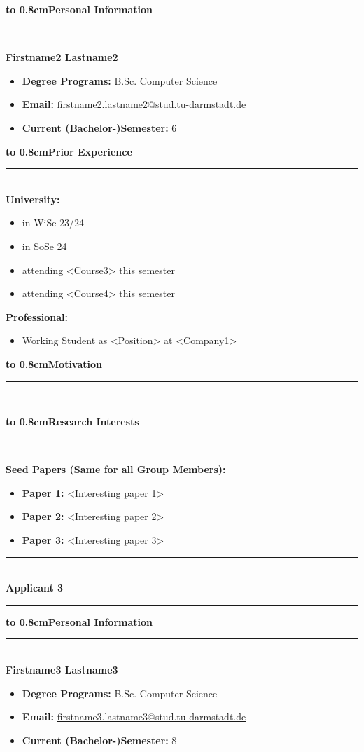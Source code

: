 \documentclass[
    USenglish,
    accentcolor=3b,
]{tudaexercise}
\newcommand{\fat}[1]{{\Large\textbf{\textcolor{accentcolor}{\textsf{#1}}}}}
\newcommand{\iconpsection}[2]{%
    \mbox{}\fat{\hbox to 0.8cm{#1}#2}%
    \vspace{-1.2em}\par\noindent\rule{\textwidth}{0.4pt}\\[1em]
}
\newcommand{\applicant}[1]{%
\rule{\textwidth}{0.4pt}\\[.4ex]%
{\LARGE\bfseries Applicant #1}\\[-1.2ex]%
\rule{\textwidth}{0.4pt}%
}
\newcommand{\seedpapers}{
    \begin{defBox}
        \begin{itemize}
            \item \textbf{Paper 1:} <Interesting paper 1>
            \item \textbf{Paper 2:} <Interesting paper 2>
            \item \textbf{Paper 3:} <Interesting paper 3>
        \end{itemize}
    \end{defBox}
}
\begin{document}
    \iconpsection{\faUser}{Personal Information}
    \textbf{\large Firstname2 Lastname2}
    \begin{itemize}
        \item \textbf{Degree Programs:} B.Sc. Computer Science
        \item \textbf{Email:} \href{mailto:firstname2.lastname2@stud.tu-darmstadt.de}{firstname2.lastname2@stud.tu-darmstadt.de}
        \item \textbf{Current (Bachelor-)Semester:} 6
    \end{itemize}

    \iconpsection{\faGraduationCap}{Prior Experience}
    \textbf{University:}
    \begin{itemize}
        \item <Course1> in WiSe 23/24
        \item <Course2> in SoSe 24
        \item attending <Course3> this semester
        \item attending <Course4> this semester
    \end{itemize}
    \textbf{Professional:}
    \begin{itemize}
        \item Working Student as <Position> at <Company1>
    \end{itemize}
    \iconpsection{\faClipboard}{Motivation}
    \lipsum[1]

    \iconpsection{\faBook}{Research Interests}
    \textbf{Seed Papers (Same for all Group Members):}
    \seedpapers{}
    \clearpage{}
    \applicant{3}\label{applicant3}%
    \vspace{1em}

    \iconpsection{\faUser}{Personal Information}
    \textbf{\large Firstname3 Lastname3}
    \begin{itemize}
        \item \textbf{Degree Programs:} B.Sc. Computer Science
        \item \textbf{Email:} \href{mailto:firstname3.lastname3@stud.tu-darmstadt.de}{firstname3.lastname3@stud.tu-darmstadt.de}
        \item \textbf{Current (Bachelor-)Semester:} 8
    \end{itemize}
\end{document}
